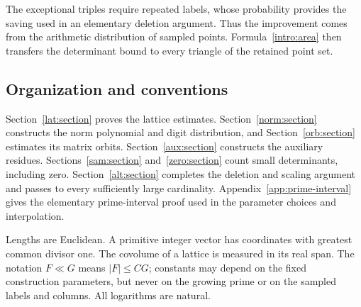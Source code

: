 The exceptional triples require repeated labels, whose probability
provides the saving used in an elementary deletion argument. Thus the
improvement comes from the arithmetic distribution of sampled points.
Formula~\eqref{intro:area} then transfers the determinant bound to every
triangle of the retained point set.

\subsection{Organization and conventions}

Section~\ref{lat:section} proves the lattice estimates.
Section~\ref{norm:section} constructs the norm polynomial and digit
distribution, and Section~\ref{orb:section} estimates its matrix orbits.
Section~\ref{aux:section} constructs the auxiliary residues.
Sections~\ref{sam:section} and~\ref{zero:section} count small determinants,
including zero. Section~\ref{alt:section} completes the deletion and scaling
argument and passes to every sufficiently large cardinality.
Appendix~\ref{app:prime-interval} gives the elementary prime-interval proof
used in the parameter choices and interpolation.

Lengths are Euclidean. A primitive integer vector has coordinates with
greatest common divisor one. The covolume of a lattice is measured in its
real span. The notation $F\ll G$ means $|F|\le CG$; constants may depend on
the fixed construction parameters, but never on the growing prime or on
the sampled labels and columns. All logarithms are natural.
